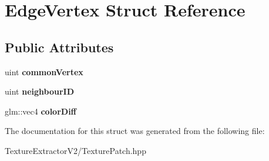 \hypertarget{struct_edge_vertex}{}\section{Edge\+Vertex Struct Reference}
\label{struct_edge_vertex}
\subsection*{Public Attributes}
\begin{DoxyCompactItemize}
\item 
\hypertarget{struct_edge_vertex_a8439c6928189921562f355db598fcf01}{}uint {\bfseries common\+Vertex}\label{struct_edge_vertex_a8439c6928189921562f355db598fcf01}

\item 
\hypertarget{struct_edge_vertex_a0383800c9299c747dc5ddbf4b397806d}{}uint {\bfseries neighbour\+I\+D}\label{struct_edge_vertex_a0383800c9299c747dc5ddbf4b397806d}

\item 
\hypertarget{struct_edge_vertex_a7c1790b8527e54c9eca13038c5351032}{}glm\+::vec4 {\bfseries color\+Diff}\label{struct_edge_vertex_a7c1790b8527e54c9eca13038c5351032}

\end{DoxyCompactItemize}


The documentation for this struct was generated from the following file\+:\begin{DoxyCompactItemize}
\item 
Texture\+Extractor\+V2/Texture\+Patch.\+hpp\end{DoxyCompactItemize}
